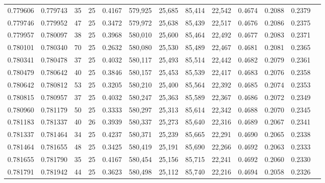 \begin{tabular}{rrrrrrrrrrrrr}
0.779606 & 0.779743 &    35 &  25 &                                     0.4167 & 579,925 &  25,685 &  85,414 &  22,542 & 0.4674 & 0.2088 & 0.2379 \\
0.779746 & 0.779952 &    47 &  25 &                                     0.3472 & 579,972 &  25,638 &  85,439 &  22,517 & 0.4676 & 0.2086 & 0.2375 \\
0.779957 & 0.780097 &    38 &  25 &                                     0.3968 & 580,010 &  25,600 &  85,464 &  22,492 & 0.4677 & 0.2083 & 0.2371 \\
0.780101 & 0.780340 &    70 &  25 &                                     0.2632 & 580,080 &  25,530 &  85,489 &  22,467 & 0.4681 & 0.2081 & 0.2365 \\
0.780341 & 0.780478 &    37 &  25 &                                     0.4032 & 580,117 &  25,493 &  85,514 &  22,442 & 0.4682 & 0.2079 & 0.2361 \\
0.780479 & 0.780642 &    40 &  25 &                                     0.3846 & 580,157 &  25,453 &  85,539 &  22,417 & 0.4683 & 0.2076 & 0.2358 \\
0.780642 & 0.780812 &    53 &  25 &                                     0.3205 & 580,210 &  25,400 &  85,564 &  22,392 & 0.4685 & 0.2074 & 0.2353 \\
0.780815 & 0.780957 &    37 &  25 &                                     0.4032 & 580,247 &  25,363 &  85,589 &  22,367 & 0.4686 & 0.2072 & 0.2349 \\
0.780960 & 0.781179 &    50 &  25 &                                     0.3333 & 580,297 &  25,313 &  85,614 &  22,342 & 0.4688 & 0.2070 & 0.2345 \\
0.781183 & 0.781337 &    40 &  26 &                                     0.3939 & 580,337 &  25,273 &  85,640 &  22,316 & 0.4689 & 0.2067 & 0.2341 \\
0.781337 & 0.781464 &    34 &  25 &                                     0.4237 & 580,371 &  25,239 &  85,665 &  22,291 & 0.4690 & 0.2065 & 0.2338 \\
0.781464 & 0.781655 &    48 &  25 &                                     0.3425 & 580,419 &  25,191 &  85,690 &  22,266 & 0.4692 & 0.2063 & 0.2333 \\
0.781655 & 0.781790 &    35 &  25 &                                     0.4167 & 580,454 &  25,156 &  85,715 &  22,241 & 0.4692 & 0.2060 & 0.2330 \\
0.781791 & 0.781942 &    44 &  25 &                                     0.3623 & 580,498 &  25,112 &  85,740 &  22,216 & 0.4694 & 0.2058 & 0.2326 \\

\end{tabular}
